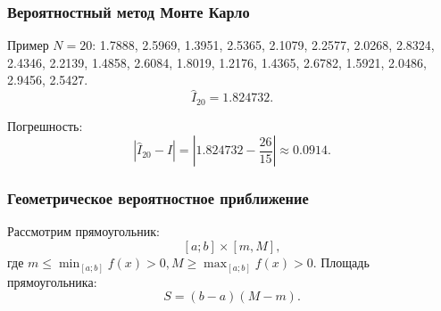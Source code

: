 \documentclass[10pt]{beamer}
\begin{document}
\begin{frame}[fragile]
\frametitle{Вероятностный метод Монте Карло}

Пример $N = 20$:
 1.7888, 2.5969, 1.3951, 2.5365, 2.1079, 2.2577, 2.0268, 2.8324, 2.4346, 2.2139, 1.4858, 2.6084, 1.8019, 1.2176, 1.4365, 2.6782, 1.5921, 2.0486, 2.9456, 2.5427. 
$$\hat{I}_{20} = 1.824732 .$$

Погрешность:
$$|\hat{I}_{20} - I| = \left|1.824732 - \frac{26}{15}\right| \approx 0.0914 .$$
\end{frame}


\begin{frame}[fragile]
\frametitle{Геометрическое вероятностное приближение}

Рассмотрим прямоугольник:
$$[a; b] \times [m, M] ,$$
где $m \le \min_{[a; b]} f(x) > 0, M \ge \max_{[a; b]} f(x) > 0$. Площадь прямоугольника:
$$S = (b - a) (M - m).$$
\end{frame}
\end{document}
